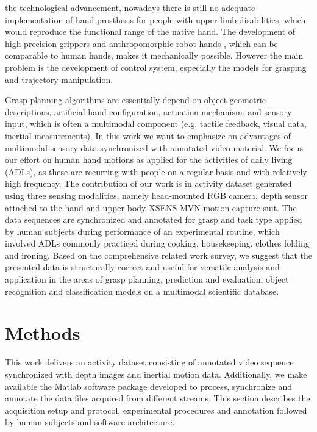\documentclass[journal]{IEEEtran}
\begin{document}
 the technological advancement, nowadays there is still no adequate implementation of hand prosthesis for people with upper limb disabilities, which would reproduce the functional range of the native hand. The development of high-precision grippers and anthropomorphic robot hands \cite{IEEEhowto: Grebenstein}, which can be comparable to human hands, makes it mechanically possible. However the main problem is the development of control system, especially the models for grasping and trajectory manipulation.

Grasp planning algorithms are essentially depend on object geometric descriptions, artificial hand configuration, actuation mechanism, and sensory input, which is often a multimodal component (e.g. tactile feedback, visual data, inertial measurements). In this work we want to emphasize on advantages of multimodal sensory data synchronized with annotated video material. We focus our effort on human hand motions as applied for the activities of daily living (ADLs), as these are recurring with people on a regular basis and with relatively high frequency. The contribution of our work is in activity dataset generated using three sensing modalities, namely head-mounted RGB camera, depth sensor attached to the hand and upper-body XSENS MVN motion capture suit. The data sequences are synchronized and annotated for grasp and task type applied by human subjects during performance of an experimental routine, which involved ADLs commonly practiced during cooking, housekeeping, clothes folding and ironing. Based on the comprehensive related work survey, we suggest that the presented data is structurally correct and useful for versatile analysis and application in the areas of grasp planning, prediction and evaluation, object recognition and classification models on a multimodal scientific database.

\section{Methods}
This work delivers an activity dataset consisting of annotated video sequence synchronized with depth images and inertial motion data. Additionally, we make available the Matlab software package developed to process, synchronize and annotate the data files acquired from different streams. This section describes the acquisition setup and protocol, experimental procedures and annotation followed by human subjects and software architecture.
\end{document}

